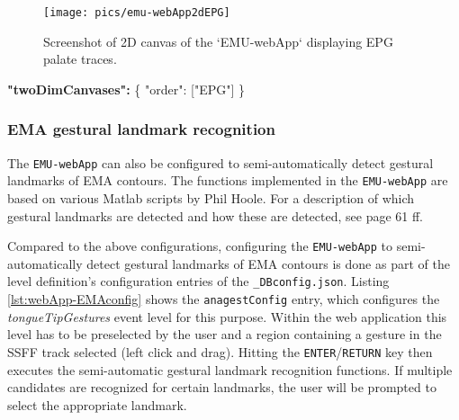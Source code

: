 \documentclass[]{book}
\newenvironment{Shaded}{\begin{snugshade}}{\end{snugshade}}
\newcommand{\DataTypeTok}[1]{\textcolor[rgb]{0.13,0.29,0.53}{#1}}
\newcommand{\ErrorTok}[1]{\textcolor[rgb]{0.64,0.00,0.00}{\textbf{#1}}}
\newcommand{\FunctionTok}[1]{\textcolor[rgb]{0.00,0.00,0.00}{#1}}
\newcommand{\OtherTok}[1]{\textcolor[rgb]{0.56,0.35,0.01}{#1}}
\newcommand{\StringTok}[1]{\textcolor[rgb]{0.31,0.60,0.02}{#1}}
\begin{document}
\begin{figure}

{\centering \texttt{[image: pics/emu-webApp2dEPG]} 

}

\caption{Screenshot of 2D canvas of the `EMU-webApp` displaying EPG palate traces.}\label{fig:webApp-2dEPG}
\end{figure}

\begin{Shaded}
\begin{Highlighting}[]
\ErrorTok{"twoDimCanvases":} \FunctionTok{\{}
    \DataTypeTok{"order"}\FunctionTok{:} \OtherTok{[}\StringTok{"EPG"}\OtherTok{]}
\FunctionTok{\}}
\end{Highlighting}
\end{Shaded}

\hypertarget{ema-gestural-landmark-recognition}{%
\subsubsection{EMA gestural landmark recognition}\label{ema-gestural-landmark-recognition}}

The \texttt{EMU-webApp} can also be configured to semi-automatically detect gestural landmarks of EMA contours. The functions implemented in the \texttt{EMU-webApp} are based on various Matlab scripts by Phil Hoole. For a description of which gestural landmarks are detected and how these are detected, see \citet{bombien:2011aa} page 61 ff.

Compared to the above configurations, configuring the \texttt{EMU-webApp} to semi-automatically detect gestural landmarks of EMA contours is done as part of the level definition's configuration entries of the \texttt{\_DBconfig.json}. Listing \ref{lst:webApp-EMAconfig} shows the \texttt{anagestConfig} entry, which configures the \emph{tongueTipGestures} event level for this purpose. Within the web application this level has to be preselected by the user and a region containing a gesture in the SSFF track selected (left click and drag). Hitting the \texttt{ENTER}/\texttt{RETURN} key then executes the semi-automatic gestural landmark recognition functions. If multiple candidates are recognized for certain landmarks, the user will be prompted to select the appropriate landmark.
\end{document}
